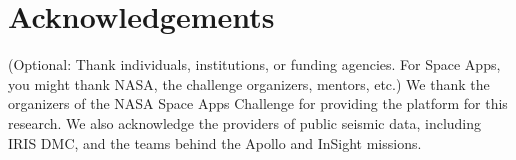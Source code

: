 \documentclass[11pt,a4paper]{article}
\begin{document}
\section*{Acknowledgements}
(Optional: Thank individuals, institutions, or funding agencies. For Space Apps, you might thank NASA, the challenge organizers, mentors, etc.)
We thank the organizers of the NASA Space Apps Challenge for providing the platform for this research. We also acknowledge the providers of public seismic data, including IRIS DMC, and the teams behind the Apollo and InSight missions.


\end{document}
